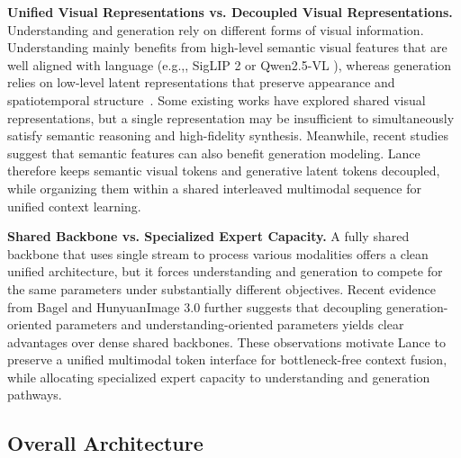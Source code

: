 \documentclass{llmxive}
\providecommand{\eg}{e.g.,\xspace}
\begin{document}
\textbf{Unified Visual Representations vs. Decoupled Visual Representations.}
Understanding and generation rely on different forms of visual information. Understanding mainly benefits from high-level semantic visual features that are well aligned with language (\eg, SigLIP 2 \cite{tschannen2025siglip} or Qwen2.5-VL \cite{Qwen2.5-VL}), whereas generation relies on low-level latent representations that preserve appearance and spatiotemporal structure~\cite{wan2025wan}. %
Some existing works \cite{liu2025tuna} have explored shared visual representations, but a single representation may be insufficient to simultaneously satisfy semantic reasoning and high-fidelity synthesis.
Meanwhile, recent studies~\cite{yu2024representation,zheng2025diffusion} suggest that semantic features can also benefit generation modeling. Lance therefore keeps semantic visual tokens and generative latent tokens decoupled, while organizing them within a shared interleaved multimodal sequence for unified context learning.

\textbf{Shared Backbone vs. Specialized Expert Capacity.}
A fully shared backbone that uses single stream to process various modalities \cite{huang2022dse,xie2025show,liu2025tuna} offers a clean unified architecture, but it forces understanding and generation to compete for the same parameters under substantially different objectives. Recent evidence from Bagel \cite{deng2025emerging} and HunyuanImage 3.0 \cite{cao2025hunyuanimage} further suggests that decoupling generation-oriented parameters and understanding-oriented parameters yields clear advantages over dense shared backbones.
These observations motivate Lance to preserve a unified multimodal token interface for bottleneck-free context fusion, while allocating specialized expert capacity to understanding and generation pathways.



\subsection{Overall Architecture}
\end{document}
